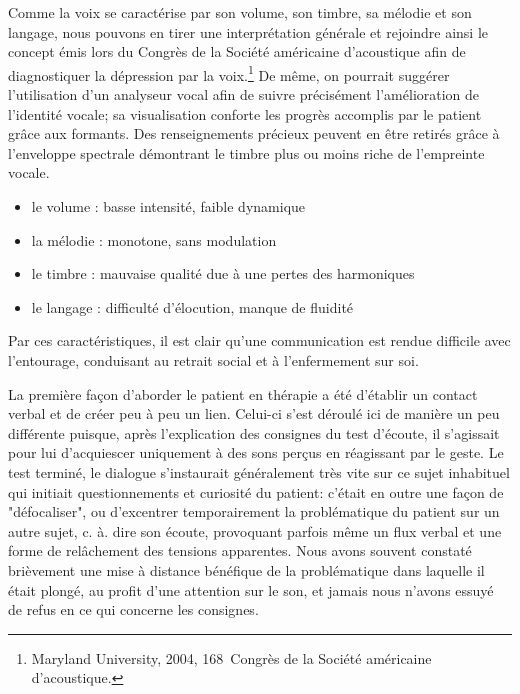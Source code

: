 \begin{itemize}
	
	Comme la voix se caractérise par son volume, son timbre, sa mélodie et son
	langage, nous pouvons en tirer une interprétation générale et  rejoindre ainsi le concept émis lors du 
	Congrès de la Société
	américaine d'acoustique \autocite{le_service_metronews}
	afin de diagnostiquer la
	dépression par la voix.\footnote{Maryland University, 2004, 168\ieme\ Congrès de la Société
		américaine d'acoustique.}
	De même, on pourrait suggérer l'utilisation d'un analyseur vocal afin de suivre précisément 
	l'amélioration 
	de
	l'identité vocale; sa visualisation conforte les progrès accomplis par le patient grâce aux
	formants. Des renseignements précieux peuvent  en être retirés grâce à  l'enveloppe 
	spectrale 
	démontrant 
	le timbre plus ou moins riche
	de l'empreinte vocale.%
	\begin{itemize}
		\item le volume : basse intensité, faible dynamique
		\item la mélodie : monotone, sans modulation
		\item le timbre : mauvaise qualité due à une pertes des harmoniques
		\item le langage : difficulté d'élocution, manque de fluidité
	\end{itemize}
	Par ces caractéristiques, il est clair qu'une communication est rendue difficile avec l'entourage, 
conduisant au retrait social et à l'enfermement sur soi.

La première façon d'aborder le patient en thérapie a été d'établir un contact verbal et de créer peu à peu 
un 
lien.
Celui-ci s'est déroulé ici de manière un peu différente puisque, après l'explication des consignes
du test d'écoute, il s'agissait pour lui d'acquiescer uniquement à des sons perçus en réagissant par le 
geste. Le 
test 
terminé, le dialogue s'instaurait 
généralement très vite sur ce sujet inhabituel 
qui initiait questionnements et curiosité du patient:  c'était en outre une façon de "défocaliser", ou 
d'excentrer  temporairement la problématique du patient sur un autre sujet, c. à. dire son 
écoute, provoquant parfois même un flux verbal et une forme de relâchement des tensions apparentes. 
Nous avons souvent constaté brièvement une mise à distance bénéfique de la problématique dans 
laquelle il était plongé, au profit d'une attention sur le son, et jamais nous n'avons  
essuyé de refus en ce qui concerne les consignes.	
	

\end{itemize}
